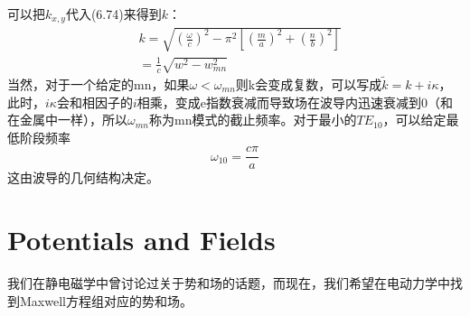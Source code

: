 \documentclass[14pt,oneside]{book}
\begin{document}
\begin{large}
可以把$k_{x,y}$代入(6.74)来得到$k$：
\begin{equation}
\begin{aligned}
& k=\sqrt{\left(\frac{\omega}{c}\right)^2-\pi^2\left[\left(\frac{m}{a}\right)^2+\left(\frac{n}{b}\right)^2\right]} \\
& =\frac{1}{c} \sqrt{w^2-w_{m n}^2}
\end{aligned}
\end{equation}
当然，对于一个给定的mn，如果$\omega<\omega_{mn}$则k会变成复数，可以写成$\tilde k=k+i\kappa$，此时，$i\kappa$会和相因子的$i$相乘，变成e指数衰减而导致场在波导内迅速衰减到0（和在金属中一样），所以$\omega_{mn}$称为mn模式的截止频率。对于最小的$TE_{10}$，可以给定最低阶段频率
\begin{equation}
  \omega_{10}=\frac{c\pi}{a}
\end{equation}
这由波导的几何结构决定。

\chapter{Potentials and Fields}
我们在静电磁学中曾讨论过关于势和场的话题，而现在，我们希望在电动力学中找到Maxwell方程组对应的势和场。

\end{large}
\end{document}
